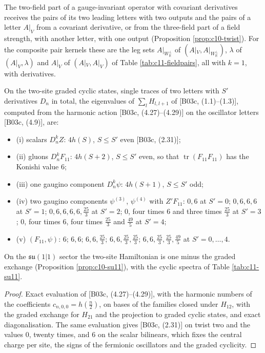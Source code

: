The two-field part of a gauge-invariant operator with covariant derivatives receives the pairs of its two leading letters with two outputs and the pairs of a letter $A|_V$ from a covariant derivative, or from the three-field part of a field strength, with another letter, with one output (Proposition \ref{prop:c10-twist}). For the composite pair kernels these are the leg sets $A|_{W_{\mathbb R}^\perp}$ of $(A|_V,A|_{W_{\mathbb R}^\perp})$, $\lambda$ of $(A|_V,\lambda)$ and $A|_V$ of $(A|_V,A|_V)$ of Table \ref{tab:c11-fieldpairs}, all with $k=1$, with derivatives.

\begin{proposition}
\label{prop:c11-targets}
On the two-site graded cyclic states, single traces of two letters with $S'$ derivatives $D_n$ in total, the eigenvalues of $\sum_lH_{l,l+1}$ of [B03c, (1.1)--(1.3)], computed from the harmonic action [B03c, (4.27)--(4.29)] on the oscillator letters [B03c, (4.9)], are:
\begin{itemize}
\item (i) scalars $D_n^kZ$: $4h(S)$, $S\le S'$ even [B03c, (2.31)];
\item (ii) gluons $D_n^kF_{11}$: $4h(S+2)$, $S\le S'$ even, so that $\operatorname{tr}(F_{11}F_{11})$ has the Konishi value $6$;
\item (iii) one gaugino component $D_n^k\psi$: $4h(S+1)$, $S\le S'$ odd;
\item (iv) two gaugino components $\psi^{(3)}$, $\psi^{(4)}$ with $Z'F_{11}$: $0,6$ at $S'=0$; $0,6,6,6$ at $S'=1$; $0,6,6,6,6,\tfrac{25}3$ at $S'=2$; $0$, four times $6$ and three times $\tfrac{25}3$ at $S'=3$; $0$, four times $6$, four times $\tfrac{25}3$ and $\tfrac{49}5$ at $S'=4$;
\item (v) $(F_{11},\psi)$: $6$; $6,6$; $6,6,\tfrac{25}3$; $6,6,\tfrac{25}3,\tfrac{25}3$; $6,6,\tfrac{25}3,\tfrac{25}3,\tfrac{49}5$ at $S'=0,\dots,4$.
\end{itemize}
On the $\mathfrak{su}(1|1)$ sector the two-site Hamiltonian is one minus the graded exchange (Proposition \ref{prop:c10-su11}), with the cyclic spectra of Table \ref{tab:c11-su11}.
\end{proposition}

\begin{proof}
Exact evaluation of [B03c, (4.27)--(4.29)], with the harmonic numbers of the coefficients $c_{n,0,0}=h(\tfrac n2)$, on bases of the families closed under $H_{12}$, with the graded exchange for $H_{21}$ and the projection to graded cyclic states, and exact diagonalisation. The same evaluation gives [B03c, (2.31)] on twist two and the values $0$, twenty times, and $6$ on the scalar bilinears, which fixes the central charge per site, the signs of the fermionic oscillators and the graded cyclicity.
\end{proof}

